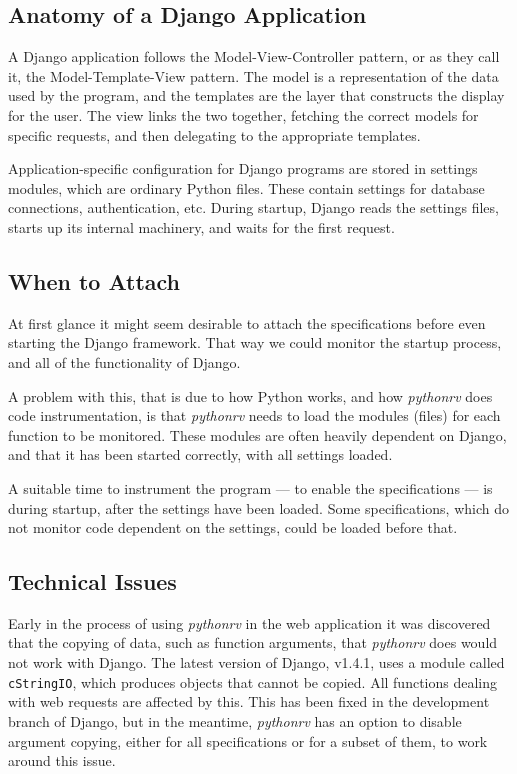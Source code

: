\documentclass[a4paper,11pt]{kth-mag}
\begin{document}
\subsection{Anatomy of a Django Application}

A Django application follows the Model-View-Controller pattern, or as they call
it, the Model-Template-View pattern. The model is a representation of the data
used by the program, and the templates are the layer that constructs the
display for the user. The view links the two together, fetching the correct
models for specific requests, and then delegating to the appropriate templates.

Application-specific configuration for Django programs are stored in settings
modules, which are ordinary Python files. These contain settings for database
connections, authentication, etc. During startup, Django reads the settings
files, starts up its internal machinery, and waits for the first request.


\subsection{When to Attach}

At first glance it might seem desirable to attach the specifications before
even starting the Django framework. That way we could monitor the startup
process, and all of the functionality of Django.

A problem with this, that is due to how Python works, and how \textit{pythonrv}
does code instrumentation, is that \textit{pythonrv} needs to load the modules
(files) for each function to be monitored. These modules are often heavily
dependent on Django, and that it has been started correctly, with all settings
loaded.

A suitable time to instrument the program --- to enable the specifications ---
is during startup, after the settings have been loaded. Some specifications,
which do not monitor code dependent on the settings, could be loaded before
that.


\subsection{Technical Issues}

Early in the process of using \textit{pythonrv} in the web application it was
discovered that the copying of data, such as function arguments, that
\textit{pythonrv} does would not work with Django. The latest version of
Django, v1.4.1, uses a module called \texttt{cStringIO}, which produces objects
that cannot be copied. All functions dealing with web requests are affected by
this. This has been fixed in the development branch of Django, but in the
meantime, \textit{pythonrv} has an option to disable argument copying, either
for all specifications or for a subset of them, to work around this issue.
\end{document}
